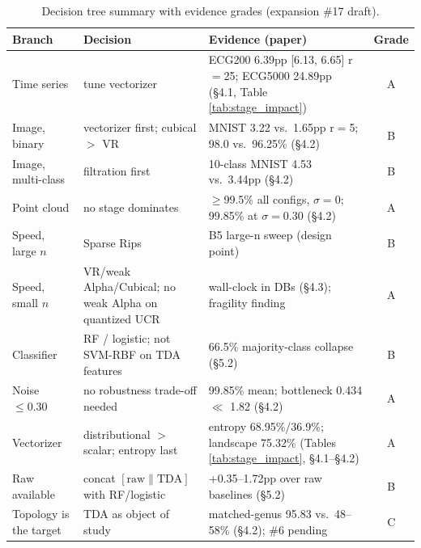 \begin{table}[H]
  \centering
  \caption{Decision tree summary with evidence grades (expansion \#17 draft).}
  \label{tab:decision_tree}
  \begin{tabularx}{\textwidth}{@{}l l X c@{}}
    \toprule
    Branch & Decision & Evidence (paper) & Grade \\
    \midrule
    Time series & tune vectorizer & ECG200 6.39pp [6.13, 6.65] r$=$25; ECG5000 24.89pp (\S4.1, Table \ref{tab:stage_impact}) & A \\
    Image, binary & vectorizer first; cubical $>$ VR & MNIST 3.22 vs.\ 1.65pp r$=$5; 98.0 vs.\ 96.25\% (\S4.2) & B \\
    Image, multi-class & filtration first & 10-class MNIST 4.53 vs.\ 3.44pp (\S4.2) & B \\
    Point cloud & no stage dominates & $\ge$99.5\% all configs, $\sigma{=}0$; 99.85\% at $\sigma{=}0.30$ (\S4.2) & A \\
    Speed, large $n$ & Sparse Rips & B5 large-n sweep (design point) & B \\
    Speed, small $n$ & VR/weak Alpha/Cubical; no weak Alpha on quantized UCR & wall-clock in DBs (\S4.3); fragility finding & A \\
    Classifier & RF / logistic; not SVM-RBF on TDA features & 66.5\% majority-class collapse (\S5.2) & B \\
    Noise $\le 0.30$ & no robustness trade-off needed & 99.85\% mean; bottleneck 0.434 $\ll$ 1.82 (\S4.2) & A \\
    Vectorizer & distributional $>$ scalar; entropy last & entropy 68.95\%/36.9\%; landscape 75.32\% (Tables \ref{tab:stage_impact}, \S4.1--\S4.2) & A \\
    Raw available & concat $[\text{raw}\|\text{TDA}]$ with RF/logistic & +0.35--1.72pp over raw baselines (\S5.2) & B \\
    Topology is the target & TDA as object of study & matched-genus 95.83 vs.\ 48--58\% (\S4.2); \#6 pending & C \\
    \bottomrule
  \end{tabularx}
\end{table}

